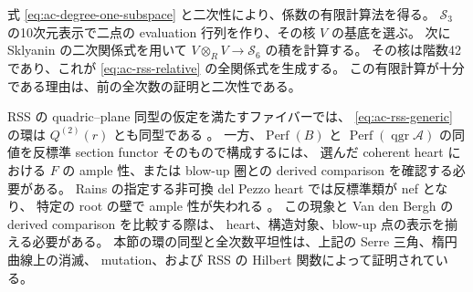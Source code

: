 \begin{remark}\label{rem:ac-coefficients-and-hearts}
式 \eqref{eq:ac-degree-one-subspace} と二次性により、係数の有限計算法を得る。
$\mathcal S_3$ の10次元表示で二点の evaluation 行列を作り、その核 $V$ の基底を選ぶ。
次に Sklyanin の二次関係式を用いて
$V\otimes_RV\to\mathcal S_6$ の積を計算する。
その核は階数42であり、これが \eqref{eq:ac-rss-relative} の全関係式を生成する。
この有限計算が十分である理由は、前の全次数の証明と二次性である。

RSS の quadric--plane 同型の仮定を満たすファイバーでは、
\eqref{eq:ac-rss-generic} の環は $Q^{(2)}(r)$ とも同型である
\cite[定理7.3]{RSS2023}。
一方、$\operatorname{Perf}(B)$ と $\operatorname{Perf}(\operatorname{qgr}\mathscr A)$
の同値を反標準 section functor そのもので構成するには、
選んだ coherent heart における $F$ の ample 性、または blow-up 圏との
derived comparison を確認する必要がある。
Rains の指定する非可換 del Pezzo heart では反標準類が nef となり、
特定の root の壁で ample 性が失われる
\cite[\S4]{PencilRainsFiltered}。
この現象と Van den Bergh の derived comparison
\cite[定理11.1.3]{BlowupVdB2001} を比較する際は、
heart、構造対象、blow-up 点の表示を揃える必要がある。
本節の環の同型と全次数平坦性は、上記の Serre 三角、楕円曲線上の消滅、
mutation、および RSS の Hilbert 関数によって証明されている。
\end{remark}
